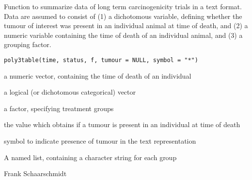 \begin{Description}\relax
Function to summarize data of long term carcinogenicity trials in a text format.
Data are assumed to consist of (1) a dichotomous variable, 
defining whether the tumour of interest was present in an individual animal at time of death,
and (2) a numeric variable containing the time of death of an individual animal,
and (3) a grouping factor.
\end{Description}
\begin{Usage}
\begin{verbatim}
poly3table(time, status, f, tumour = NULL, symbol = "*")
\end{verbatim}
\end{Usage}
\begin{Arguments}
\begin{ldescription}
\item[\code{time}] a numeric vector, containing the time of death of an individual 
\item[\code{status}] a logical (or dichotomous categorical) vector 
\item[\code{f}] a factor, specifying treatment groups
\item[\code{tumour}] the value which  obtains if a tumour is present in an individual at time of death  
\item[\code{symbol}] symbol to indicate presence of tumour in the text representation 
\end{ldescription}
\end{Arguments}
\begin{Value}
A named list, containing a character string for each group
\end{Value}
\begin{Author}\relax
Frank Schaarschmidt
\end{Author}
\begin{Examples}
\end{Examples}


